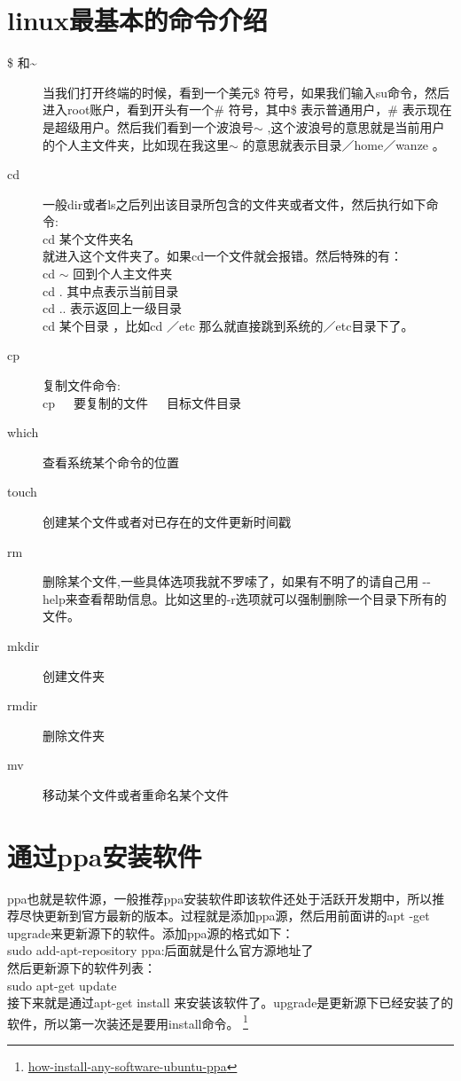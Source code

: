 \section{linux最基本的命令介绍}
\begin{description}
\item[ \${} 和\~{}] 当我们打开终端的时候，看到一个美元\$ 符号，如果我们输入su命令，然后进入root账户，看到开头有一个\#{} 符号，其中\$ 表示普通用户，\#{} 表示现在是超级用户。然后我们看到一个波浪号$\sim$  ,这个波浪号的意思就是当前用户的个人主文件夹，比如现在我这里$\sim$ 的意思就表示目录／home／wanze 。
\item[ cd] 一般dir或者ls之后列出该目录所包含的文件夹或者文件，然后执行如下命令:\\cd 某个文件夹名 \\ 就进入这个文件夹了。如果cd一个文件就会报错。然后特殊的有：\\ cd $\sim$ 回到个人主文件夹\\cd . 其中点表示当前目录\\cd .. 表示返回上一级目录\\cd 某个目录 ，比如cd ／etc 那么就直接跳到系统的／etc目录下了。
\item[ cp] 复制文件命令:\\ cp~~~要复制的文件~~~目标文件目录 
\item[ which] 查看系统某个命令的位置
\item[ touch] 创建某个文件或者对已存在的文件更新时间戳
\item[ rm ]删除某个文件,一些具体选项我就不罗嗦了，如果有不明了的请自己用 -{}- help来查看帮助信息。比如这里的-r选项就可以强制删除一个目录下所有的文件。
\item[ mkdir] 创建文件夹
\item[ rmdir] 删除文件夹
\item[ mv ]移动某个文件或者重命名某个文件
\end{description}

\section{通过ppa安装软件}
ppa也就是软件源，一般推荐ppa安装软件即该软件还处于活跃开发期中，所以推荐尽快更新到官方最新的版本。过程就是添加ppa源，然后用前面讲的apt -get upgrade来更新源下的软件。添加ppa源的格式如下：\\
sudo add-apt-repository ppa:后面就是什么官方源地址了\\
然后更新源下的软件列表：\\
sudo apt-get update\\
接下来就是通过apt-get  install 来安装该软件了。upgrade是更新源下已经安装了的软件，所以第一次装还是要用install命令。
\footnote{\href{http://linuxers.org/howto/how-install-any-software-ubuntu-ppa}{how-install-any-software-ubuntu-ppa}}

